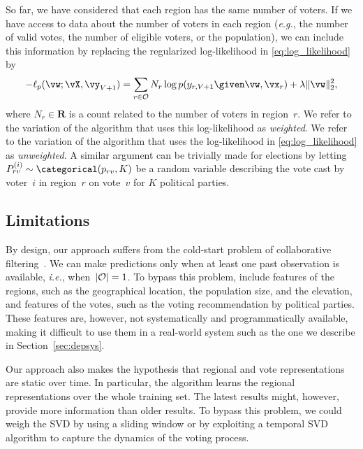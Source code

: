 So far, we have considered that each region has the same number of voters.
If we have access to data about the number of voters in each region (\textit{e.g.}, the number of valid votes, the number of eligible voters, or the population), we can include this information by replacing the regularized log-likelihood in \eqref{eq:log_likelihood} by
\begin{equation}
	\label{eq:weighted}
	-\ell_p(\vw ; \vX, \vy_{V+1}) = \sum_{r \in \Obs} N_r \log p(y_{r,V+1} \given \vw, \vx_r) + \lambda \Vert \vw \Vert_2^2,
\end{equation}
where $N_r \in \mathbf{R}$ is a count related to the number of voters in region~$r$.
We refer to the variation of the algorithm that uses this log-likelihood as \textit{weighted}.
We refer to the variation of the algorithm that uses the log-likelihood in \eqref{eq:log_likelihood} as \textit{unweighted}.
A similar argument can be trivially made for elections by letting~$P_{rv}^{(i)} \sim \categorical(p_{rv}, K)$ be a random variable describing the vote cast by voter~$i$ in region~$r$ on vote~$v$ for $K$ political parties.

\subsection{Limitations}

By design, our approach suffers from the cold-start problem of collaborative filtering~\cite{koren2009matrix}.
We can make predictions only when at least one past observation is available, \textit{i.e.}, when~$\vert \mathcal{O} \vert = 1$.
To bypass this problem, \citet{etter2016online} include features of the regions, such as the geographical location, the population size, and the elevation, and features of the votes, such as the voting recommendation by political parties.
These features are, however, not systematically and programmatically available, making it difficult to use them in a real-world system such as the one we describe in Section~\ref{sec:depsys}.

Our approach also makes the hypothesis that regional and vote representations are static over time.
In particular, the algorithm learns the regional representations over the whole training set.
The latest results might, however, provide more information than older results.
To bypass this problem, we could weigh the SVD by using a sliding window or by exploiting a temporal SVD algorithm \cite{bamler2017dynamic} to capture the dynamics of the voting process.

